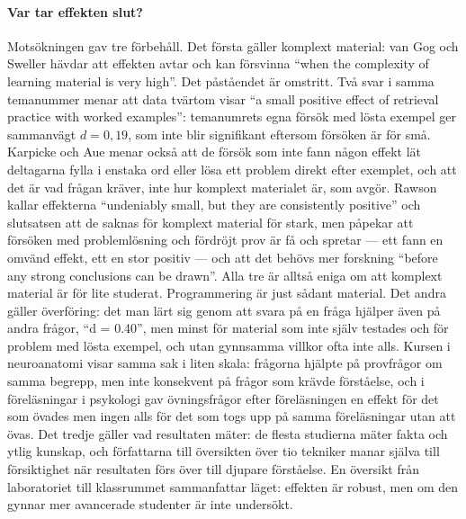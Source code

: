 \paragraph{Var tar effekten slut?}
Motsökningen gav tre förbehåll.  Det första gäller komplext material:
van Gog och Sweller hävdar att effekten avtar och kan försvinna
\enquote{when the complexity of learning material is very
high}\autocite{vanGogSweller2015}.  Det påståendet är omstritt.  Två
svar i samma temanummer menar att data tvärtom visar \enquote{a small
positive effect of retrieval practice with worked
examples}\autocite[317]{KarpickeAue2015}: temanumrets egna försök med
lösta exempel ger sammanvägt \(d = 0{,}19\), som inte blir signifikant
eftersom försöken är för små\autocite[323--324]{KarpickeAue2015}.
Karpicke och Aue menar också att de försök som inte fann någon effekt lät
deltagarna fylla i enstaka ord eller lösa ett problem direkt efter
exemplet, och att det är vad frågan kräver, inte hur komplext materialet
är, som avgör\autocite[323]{KarpickeAue2015}.  Rawson kallar effekterna
\enquote{undeniably small, but they are consistently positive} och
slutsatsen att de saknas för komplext material för
stark\autocite[328]{Rawson2015Complex}, men påpekar att försöken med
problemlösning och fördröjt prov är få och spretar --- ett fann en
omvänd effekt, ett en stor positiv --- och att det behövs mer forskning
\enquote{before any strong conclusions can be
drawn}\autocite[329]{Rawson2015Complex}.  Alla tre är alltså eniga om att
komplext material är för lite studerat.  Programmering är just sådant
material.  Det andra gäller överföring: det man lärt sig genom att
svara på en fråga hjälper även på andra frågor, \enquote{d = 0.40},
men minst för material som inte själv testades och för problem med
lösta exempel, och utan gynnsamma villkor ofta inte
alls\autocite{PanRickard2018Transfer}.
Kursen i neuroanatomi visar samma sak i liten skala: frågorna hjälpte på
provfrågor om samma begrepp, men inte konsekvent på frågor som krävde
förståelse\autocite{Pan2019Jargon}, och i föreläsningar i psykologi gav
övningsfrågor efter föreläsningen en effekt för det som övades men ingen
alls för det som togs upp på samma föreläsningar utan att
övas\autocite{Glaser2025LectureHall}.  Det tredje gäller vad
resultaten mäter: de flesta studierna mäter fakta och ytlig kunskap, och
författarna till översikten över tio tekniker manar själva till
försiktighet när resultaten förs över till djupare
förståelse\autocite{DonoghueHattie2021}.  En översikt från laboratoriet
till klassrummet sammanfattar läget: effekten är robust, men om den
gynnar mer avancerade studenter är inte undersökt\autocite{Trumbo2021Testing}.

